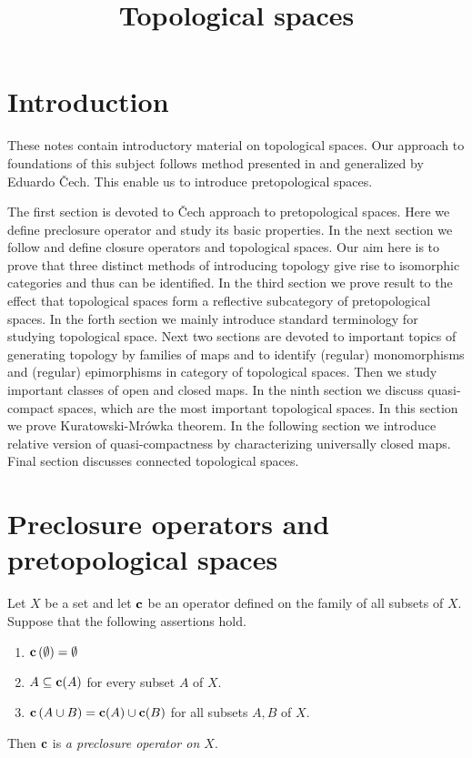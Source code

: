 



\title{Topological spaces}
\date{}
\maketitle

\section{Introduction}
\noindent
These notes contain introductory material on topological spaces. Our approach to foundations of this subject follows method presented in \cite{kuratowski1922operation} and generalized by Eduardo \v{C}ech. This enable us to introduce pretopological spaces.

The first section is devoted to \v{C}ech approach to pretopological spaces. Here we define preclosure operator and study its basic properties. In the next section we follow \cite{kuratowski1922operation} and define closure operators and topological spaces. Our aim here is to prove that three distinct methods of introducing topology give rise to isomorphic categories and thus can be identified. In the third section we prove result to the effect that topological spaces form a reflective subcategory of pretopological spaces. In the forth section we mainly introduce standard terminology for studying topological space. Next two sections are devoted to important topics of generating topology by families of maps and to identify (regular) monomorphisms and (regular) epimorphisms in category of topological spaces. Then we study important classes of open and closed maps. In the ninth section we discuss quasi-compact spaces, which are the most important topological spaces. In this section we prove Kuratowski-Mrówka theorem. In the following section we introduce relative version of quasi-compactness by characterizing universally closed maps. Final section discusses connected topological spaces.

\section{Preclosure operators and pretopological spaces}

\begin{definition}
	Let $X$ be a set and let $\mathbf{c}$ be an operator defined on the family of all subsets of $X$. Suppose that the following assertions hold.
	\begin{enumerate}[label=\textbf{(\arabic*)}, leftmargin=3.0em]
		\item $\mathbf{c}\left(\emptyset\right) = \emptyset$
		\item $A\subseteq \mathbf{c}(A)$ for every subset $A$ of $X$.
		\item $\mathbf{c}\left(A \cup B\right) = \mathbf{c}(A)\cup \mathbf{c}(B)$ for all subsets $A, B$ of $X$.
	\end{enumerate}
	Then $\mathbf{c}$ is \textit{a preclosure operator on $X$}.
\end{definition}


